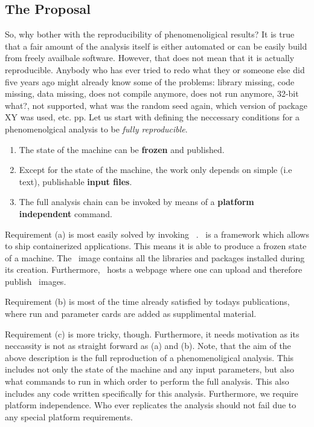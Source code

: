 \subsection{The Proposal}
So, why bother with the reproducibility of phenomenoligical results?
It is true that a fair amount of the analysis itself is either
automated or can be easily build from freely availbale
software. However, that does not mean that it is actually
reproducible. Anybody who has ever tried to redo what they or someone
else did five years ago might already know some of the problems:
library missing, code missing, data missing, does not compile anymore,
does not run anymore, 32-bit what?, not supported, what was the random
seed again, which version of package XY was used, etc. pp. Let us
start with defining the neccessary conditions for a phenomenolgical
analysis to be \emph{fully reproducible}.
%
\begin{enumerate}
\item The state of the machine can be {\bf frozen} and published.
\item Except for the state of the machine, the work only depends on
  simple (i.e text), publishable {\bf input files}.
\item The full analysis chain can be invoked by means of a
  {\bf platform independent} command.
\end{enumerate}
%

Requirement (a) is most easily solved by invoking
\docker~\cite{}. \docker~is a framework which allows to ship
containerized applications. This means it is able to produce a frozen
state of a machine. The \docker~image contains all the libraries and
packages installed during its creation. Furthermore, \docker~hosts a
webpage where one can upload and therefore publish \docker~images.

Requirement (b) is most of the time already satisfied by todays
publications, where run and parameter cards are added as supplimental
material.

Requirement (c) is more tricky, though. Furthermore, it needs
motivation as its neccassity is not as straight forward as (a) and
(b). Note, that the aim of the above description is the full
reproduction of a phenomenoligical analysis. This includes not only
the state of the machine and any input parameters, but also what
commands to run in which order to perform the full analysis. This also
includes any code written specifically for this analysis. Furthermore,
we require platform independence. Who ever replicates the analysis
should not fail due to any special platform requirements.


